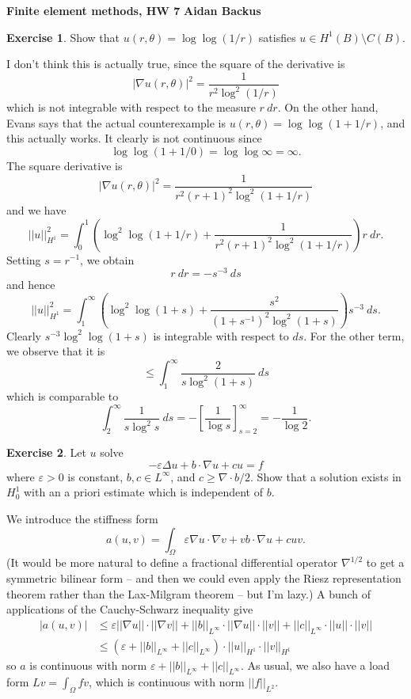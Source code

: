 \documentclass[10pt]{article}
\theoremstyle{definition}
\newtheorem{exer}{Exercise}
\begin{document}
\noindent
\large\textbf{Finite element methods, HW 7} \hfill \textbf{Aidan Backus} \\

\begin{exer}
Show that $u(r, \theta) = \log \log(1/r)$ satisfies $u \in H^1(B) \setminus C(B)$.
\end{exer}

I don't think this is actually true, since the square of the derivative is 
$$|\nabla u(r, \theta)|^2 = \frac{1}{r^2 \log^2(1/r)}$$
which is not integrable with respect to the measure $r~dr$.
On the other hand, Evans says that the actual counterexample is $u(r, \theta) = \log \log(1 + 1/r)$, and this actually works.
It clearly is not continuous since
$$\log \log(1 + 1/0) = \log \log \infty = \infty.$$
The square derivative is 
$$|\nabla u(r, \theta)|^2 = \frac{1}{r^2(r + 1)^2 \log^2(1 + 1/r)}$$
and we have 
$$||u||_{H^1}^2 = \int_0^1 \left(\log^2 \log(1 + 1/r) + \frac{1}{r^2(r + 1)^2 \log^2(1 + 1/r)}\right) r~dr.$$
Setting $s = r^{-1}$, we obtain 
$$r~dr = -s^{-3}~ds$$
and hence 
$$||u||_{H^1}^2 = \int_1^\infty \left(\log^2 \log(1 + s) + \frac{s^2}{(1 + s^{-1})^2 \log^2(1 + s)}\right) s^{-3}~ds.$$
Clearly $s^{-3} \log^2 \log(1 + s)$ is integrable with respect to $ds$. For the other term, we observe that it is 
$$\leq \int_1^\infty \frac{2}{s \log^2(1 + s)}~ds$$
which is comparable to 
$$\int_2^\infty \frac{1}{s \log^2 s}~ds = -\left[\frac{1}{\log s}\right]_{s = 2}^\infty = -\frac{1}{\log 2}.$$

\begin{exer}
Let $u$ solve
$$-\varepsilon \Delta u + b \cdot \nabla u + cu = f$$
where $\varepsilon > 0$ is constant, $b,c \in L^\infty$, and $c \geq \nabla \cdot b/2$.
Show that a solution exists in $H^1_0$ with an a priori estimate which is independent of $b$.
\end{exer}

We introduce the stiffness form
$$a(u, v) = \int_\Omega \varepsilon \nabla u \cdot \nabla v + vb\cdot \nabla u + cuv.$$
(It would be more natural to define a fractional differential operator $\nabla^{1/2}$ to get a symmetric bilinear form -- and then we could even apply the Riesz representation theorem rather than the Lax-Milgram theorem -- but I'm lazy.)
A bunch of applications of the Cauchy-Schwarz inequality give
\begin{align*}
|a(u, v)| &\leq \varepsilon ||\nabla u|| \cdot ||\nabla v|| + ||b||_{L^\infty} \cdot ||\nabla u|| \cdot ||v|| + ||c||_{L^\infty} \cdot ||u|| \cdot ||v||\\
&\leq (\varepsilon + ||b||_{L^\infty} + ||c||_{L^\infty}) \cdot ||u||_{H^1} \cdot ||v||_{H^1}
\end{align*}
so $a$ is continuous with norm $\varepsilon + ||b||_{L^\infty} + ||c||_{L^\infty}$.
As usual, we also have a load form $Lv = \int_\Omega fv$, which is continuous with norm $||f||_{L^2}$.
\end{document}
